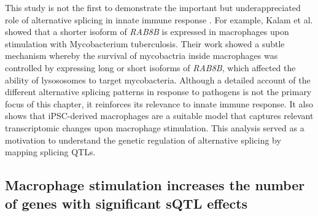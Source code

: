 This study is not the first to demonstrate the important but underappreciated role of alternative splicing in innate immune response \cite{Wagner2021-fl,Kalam2017-qa}. For example, Kalam et al. \cite{Kalam2017-qa} showed that a shorter isoform of \textit{RAB8B} is expressed in macrophages upon stimulation with Mycobacterium tuberculosis. Their work showed a subtle mechanism whereby the survival of mycobactria inside macrophages was controlled by expressing long or short isoforms of \textit{RAB8B}, which affected the ability of lysososomes to target mycobacteria. Although a detailed account of the different alternative splicing patterns in response to pathogens is not the primary focus of this chapter, it reinforces its relevance to innate immune response. It also shows that iPSC-derived macrophages are a suitable model that captures relevant transcriptomic changes upon macrophage stimulation. This analysis served as a motivation to understand the genetic regulation of alternative splicing by mapping splicing QTLs.\\

\subsection{Macrophage stimulation increases the number of genes with significant sQTL effects }




